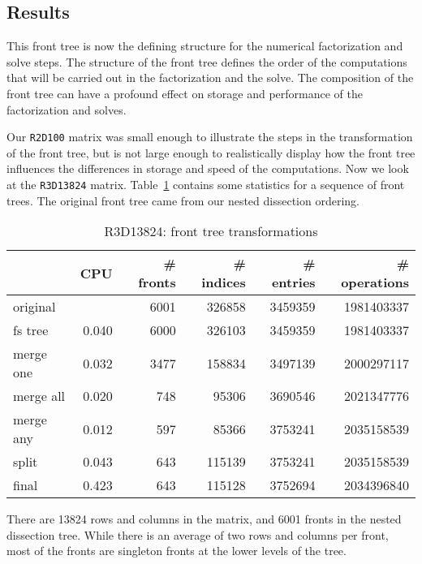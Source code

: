 \subsection{Results}
\label{subsection:tree-results}
\par
This front tree is now the defining
structure for the numerical factorization and solve steps.  
The structure of the front tree defines the order of the computations 
that will be carried out in the factorization and the solve.  
The composition of the front tree can have a profound effect on storage
and performance of the factorization and solves.
\par
Our {\tt R2D100} matrix was small enough to illustrate the steps in the
transformation of the front tree, but is not large enough to 
realistically display how the front tree influences the differences 
in storage and speed of the computations.
Now we look at the {\tt R3D13824} matrix.
Table~\ref{table:R3D13824-tree-stats} contains some statistics for a
sequence of front trees.
The original front tree came from our nested dissection ordering.
\par
\begin{table}[htbp]
\label{table:R3D13824-tree-stats}
\caption{R3D13824: front tree transformations}
\begin{center}
\begin{tabular}{l|rrrrr}
& CPU & \# fronts & \# indices & \# entries & \# operations \\ \hline
 original  &        &  6001 & 326858 & 3459359 & 1981403337 \\
 fs tree   & 0.040  &  6000 & 326103 & 3459359 & 1981403337 \\
 merge one & 0.032  &  3477 & 158834 & 3497139 & 2000297117 \\
 merge all & 0.020  &   748 &  95306 & 3690546 & 2021347776 \\
 merge any & 0.012  &   597 &  85366 & 3753241 & 2035158539 \\
 split     & 0.043  &   643 & 115139 & 3753241 & 2035158539 \\
 final     & 0.423  &   643 & 115128 & 3752694 & 2034396840
\end{tabular}
\end{center}
\end{table}
\par
There are 13824 rows and columns in the matrix, and 6001 fronts in the
nested dissection tree.
While there is an average of two rows and columns per front,
most of the fronts are singleton fronts at the lower levels of the tree.
